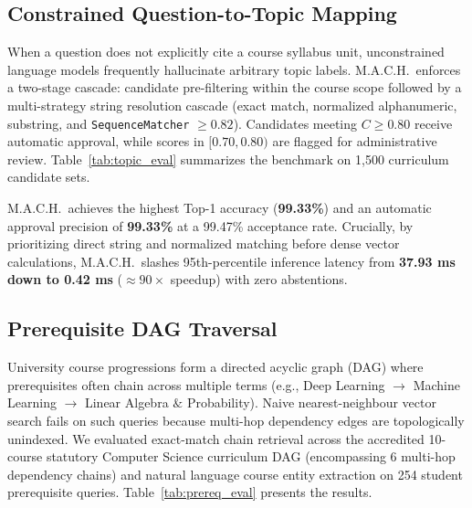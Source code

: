 \documentclass[conference]{IEEEtran}
\newcommand{\code}[1]{\texttt{\small #1}}
\begin{document}
\subsection{Constrained Question-to-Topic Mapping}
When a question does not explicitly cite a course syllabus unit, unconstrained language models frequently hallucinate arbitrary topic labels. M.A.C.H.\ enforces a two-stage cascade: candidate pre-filtering within the course scope followed by a multi-strategy string resolution cascade (exact match, normalized alphanumeric, substring, and \code{SequenceMatcher} $\ge 0.82$). Candidates meeting $C \ge 0.80$ receive automatic approval, while scores in $[0.70, 0.80)$ are flagged for administrative review. Table~\ref{tab:topic_eval} summarizes the benchmark on 1,500 curriculum candidate sets.

\begin{table}[htbp]
\caption{Question-to-Topic Mapping Benchmark ($N = 1{,}500$)}
\label{tab:topic_eval}
\centering
{}
\end{table}

M.A.C.H.\ achieves the highest Top-1 accuracy (\textbf{99.33\%}) and an automatic approval precision of \textbf{99.33\%} at a 99.47\% acceptance rate. Crucially, by prioritizing direct string and normalized matching before dense vector calculations, M.A.C.H.\ slashes 95th-percentile inference latency from \textbf{37.93 ms down to 0.42 ms} ($\approx 90\times$ speedup) with zero abstentions.

\subsection{Prerequisite DAG Traversal}
University course progressions form a directed acyclic graph (DAG) where prerequisites often chain across multiple terms (e.g., Deep Learning $\rightarrow$ Machine Learning $\rightarrow$ Linear Algebra $\&$ Probability). Naive nearest-neighbour vector search fails on such queries because multi-hop dependency edges are topologically unindexed. We evaluated exact-match chain retrieval across the accredited 10-course statutory Computer Science curriculum DAG (encompassing 6 multi-hop dependency chains) and natural language course entity extraction on 254 student prerequisite queries. Table~\ref{tab:prereq_eval} presents the results.
\end{document}
